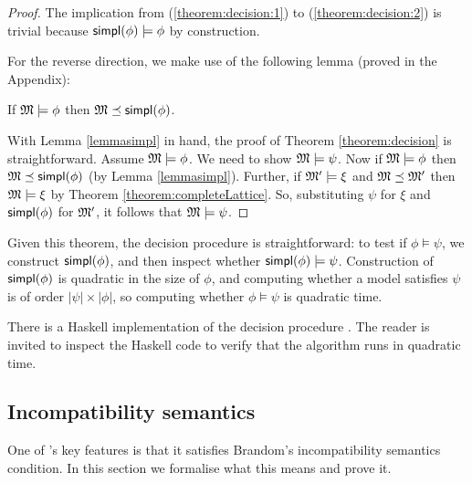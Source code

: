\begin{proof}
The implication from  (\ref{theorem:decision:1}) to
(\ref{theorem:decision:2}) is trivial because $\mathsf{simpl}(\phi) \models \phi$ by construction.

For the reverse direction, we make use of the following lemma (proved in the Appendix):
\begin{lemma}
\label{lemmasimpl}
If $\frak{M} \models \phi$ then $\frak{M} \preceq \mathsf{simpl}(\phi)$.
\end{lemma}

With Lemma \ref{lemmasimpl} in hand, the proof of Theorem \ref{theorem:decision} is straightforward.
Assume $\frak{M} \models \phi$. We need to show
$\frak{M} \models \psi$.  Now if $\frak{M} \models \phi$ then $\frak{M} \preceq
\mathsf{simpl}(\phi)$ (by Lemma \ref{lemmasimpl}).  Further, if $\frak{M}' \models \xi $
and $\frak{M} \preceq \frak{M}'$ then $\frak{M} \models \xi $ by Theorem
\ref{theorem:completeLattice}. So, substituting $\psi$ for $\xi $ and
$\mathsf{simpl}(\phi)$ for $\frak{M}'$, it follows that $\frak{M} \models \psi$.
\end{proof}

Given this theorem, the decision procedure is straightforward: to
test if $\phi \models \psi$, we construct $\mathsf{simpl}(\phi)$, and then inspect whether
$\mathsf{simpl}(\phi) \models \psi$.  Construction of $\mathsf{simpl}(\phi)$ is quadratic in the size of
$\phi$, and computing whether a model satisfies $\psi$ is of order $|\psi| \times |\phi|$, so computing whether $\phi \models \psi$ is quadratic time.

There is a Haskell implementation of the decision procedure
\cite{HaskellImplementation}.  The reader is invited to inspect the Haskell code to verify that the algorithm runs in quadratic time.

\subsection{Incompatibility semantics}\label{incompatibility}

\NI One of \cathoristic{}'s key features is that it satisfies Brandom's
incompatibility semantics condition. In this section we formalise what
this means and prove it.

